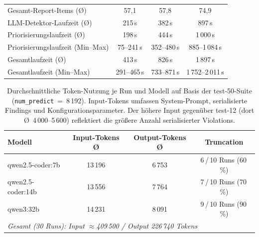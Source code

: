 \begin{table}[htbp]
{\begin{tabular}{|l|c|c|c|}
Gesamt-Report-Items (Ø)           & 57{,}1           & 57{,}8              & 74{,}9 \\
LLM-Detektor-Laufzeit (Ø)         & 215\,s           & 382\,s              & 897\,s \\
Priorisierungslaufzeit (Ø)        & 198\,s           & 444\,s              & 1\,000\,s \\
Priorisierungslaufzeit (Min--Max) & 75--241\,s       & 352--480\,s         & 885--1\,084\,s \\
Gesamtlaufzeit (Ø)                & 413\,s           & 826\,s              & 1\,897\,s \\
Gesamtlaufzeit (Min--Max)         & 291--465\,s      & 733--871\,s         & 1\,752--2\,011\,s \\
\hline
\end{tabular}
}%
\label{tab:modell_summary_50}
\end{table}

\clearpage

\label{app:token_economy_50}

\begin{table}[htbp]
\centering
\setlength{\tabcolsep}{4pt}
\renewcommand{\arraystretch}{1.2}
\caption[Token-Nutzung pro Modell (test-50)]{Durchschnittliche Token-Nutzung je Run und Modell auf Basis der test-50-Suite (\texttt{num\_predict}~=~8\,192). Input-Tokens umfassen System-Prompt, serialisierte Findings und Konfigurationsparameter. Der höhere Input gegenüber test-12 (dort \O{}~4\,000--5\,600) reflektiert die größere Anzahl serialisierter Violations.}
\begin{tabular}{|l|c|c|c|}
\hline
\textbf{Modell} & \textbf{Input-Tokens Ø} & \textbf{Output-Tokens Ø} & \textbf{Truncation} \\
\hline
qwen2.5-coder:7b  & 13\,196 & 6\,753 & 6\,/\,10 Runs (60\,\%) \\
\hline
qwen2.5-coder:14b & 13\,556 & 7\,764 & 7\,/\,10 Runs (70\,\%) \\
\hline
qwen3:32b         & 14\,231 & 8\,091 & 9\,/\,10 Runs (90\,\%) \\
\hline
\multicolumn{4}{|l|}{\textit{Gesamt (30 Runs): Input $\approx$409\,500 / Output 226\,740 Tokens}} \\
\hline
\end{tabular}
\label{tab:token_economy_50}
\end{table}

\label{app:effizienz_metriken_50}

